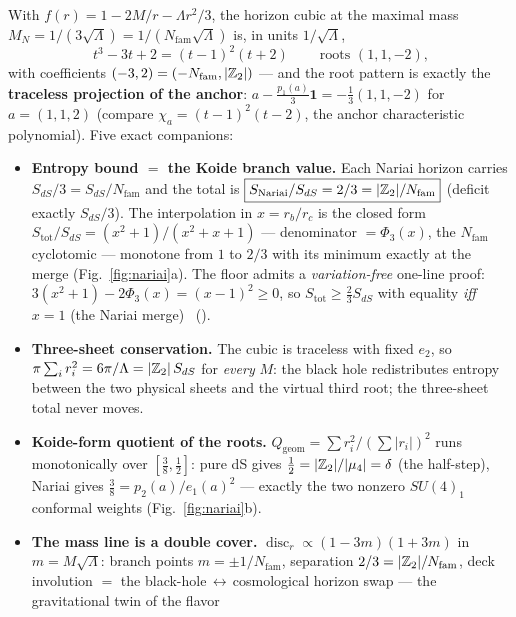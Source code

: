 \TFPTmotif

\begin{keybox}[Nariai $=$ the anchor; the Koide $2/3$ is the entropy bound \mE\ (\veri{v101\_horizon\_anchor.py})]
With $f(r)=1-2M/r-\Lambda r^2/3$, the horizon cubic at the maximal mass
$M_N=1/(3\sqrt\Lambda)=1/(N_{\mathrm{fam}}\sqrt\Lambda)$ is, in units $1/\sqrt\Lambda$,
\[
  \boxed{\ t^3-3t+2=(t-1)^2(t+2)\ }\qquad\text{roots }(1,1,-2),
\]
with coefficients $(-3,2)=(-N_{\mathrm{fam}},|\mathbb{Z}_2|)$ --- and the root pattern is exactly the
\textbf{traceless projection of the anchor}: $a-\tfrac{p_1(a)}{3}\mathbf 1=-\tfrac13(1,1,-2)$ for
$a=(1,1,2)$ (compare $\chi_a=(t-1)^2(t-2)$, the anchor characteristic polynomial). Five exact companions:
\begin{itemize}\setlength\itemsep{2pt}
\item \textbf{Entropy bound $=$ the Koide branch value.} Each Nariai horizon carries $S_{dS}/3=S_{dS}/N_{\mathrm{fam}}$
and the total is $\boxed{S_{\mathrm{Nariai}}/S_{dS}=2/3=|\mathbb{Z}_2|/N_{\mathrm{fam}}}$ (deficit exactly $S_{dS}/3$). The
interpolation in $x=r_b/r_c$ is the closed form
$S_{\mathrm{tot}}/S_{dS}=(x^2{+}1)/(x^2{+}x{+}1)$ --- denominator $=\Phi_3(x)$, the $N_{\mathrm{fam}}$
cyclotomic --- monotone from $1$ to $2/3$ with its minimum exactly at the merge (Fig.~\ref{fig:nariai}a).
The floor admits a \emph{variation-free} one-line proof: $3(x^2{+}1)-2\Phi_3(x)=(x{-}1)^2\ge0$, so
$S_{\mathrm{tot}}\ge\tfrac23 S_{dS}$ with equality \emph{iff} $x=1$ (the Nariai merge) \mE\ ().
\item \textbf{Three-sheet conservation.} The cubic is traceless with fixed $e_2$, so
$\pi\sum_i r_i^2=6\pi/\Lambda=|\mathbb{Z}_2|\,S_{dS}$ for \emph{every} $M$: the black hole redistributes entropy
between the two physical sheets and the virtual third root; the three-sheet total never moves.
\item \textbf{Koide-form quotient of the roots.} $Q_{\mathrm{geom}}=\sum r_i^2/(\sum|r_i|)^2$ runs
monotonically over $[\tfrac38,\tfrac12]$: pure dS gives $\tfrac12=|\mathbb{Z}_2|/|\mu_4|=\delta$ (the half-step),
Nariai gives $\tfrac38=p_2(a)/e_1(a)^2$ --- exactly the two nonzero $SU(4)_1$ conformal weights
(Fig.~\ref{fig:nariai}b).
\item \textbf{The mass line is a double cover.} $\operatorname{disc}_r\propto(1-3m)(1+3m)$ in
$m=M\sqrt\Lambda$: branch points $m=\pm1/N_{\mathrm{fam}}$, separation $2/3=|\mathbb{Z}_2|/N_{\mathrm{fam}}$, deck involution
$=$ the black-hole$\,\leftrightarrow\,$cosmological horizon swap --- the gravitational twin of the flavor

\end{itemize}
\end{keybox}
